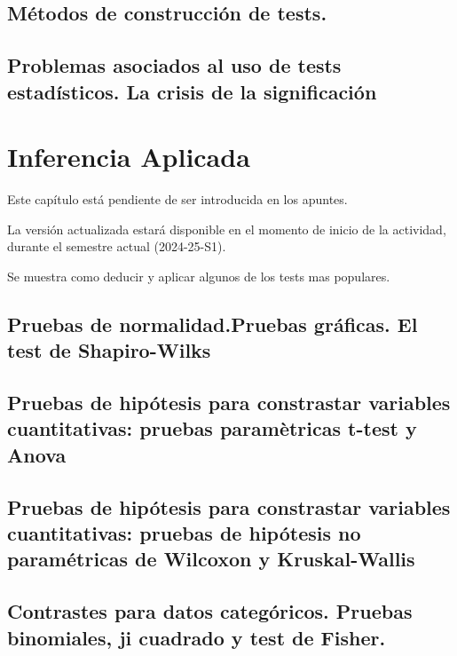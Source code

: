 \documentclass[
]{article}
\begin{document}
\subsection{Métodos de construcción de tests.}\label{muxe9todos-de-construcciuxf3n-de-tests.}

\subsection{Problemas asociados al uso de tests estadísticos. La crisis de la significación}\label{problemas-asociados-al-uso-de-tests-estaduxedsticos.-la-crisis-de-la-significaciuxf3n}

\section{Inferencia Aplicada}\label{inferencia-aplicada}

Este capítulo está pendiente de ser introducida en los apuntes.

La versión actualizada estará disponible en el momento de inicio de la actividad, durante el semestre actual (2024-25-S1).

Se muestra como deducir y aplicar algunos de los tests mas populares.

\subsection{Pruebas de normalidad.Pruebas gráficas. El test de Shapiro-Wilks}\label{pruebas-de-normalidad.pruebas-gruxe1ficas.-el-test-de-shapiro-wilks}

\subsection{Pruebas de hipótesis para constrastar variables cuantitativas: pruebas paramètricas t-test y Anova}\label{pruebas-de-hipuxf3tesis-para-constrastar-variables-cuantitativas-pruebas-paramuxe8tricas-t-test-y-anova}

\subsection{Pruebas de hipótesis para constrastar variables cuantitativas: pruebas de hipótesis no paramétricas de Wilcoxon y Kruskal-Wallis}\label{pruebas-de-hipuxf3tesis-para-constrastar-variables-cuantitativas-pruebas-de-hipuxf3tesis-no-paramuxe9tricas-de-wilcoxon-y-kruskal-wallis}

\subsection{Contrastes para datos categóricos. Pruebas binomiales, ji cuadrado y test de Fisher.}\label{contrastes-para-datos-categuxf3ricos.-pruebas-binomiales-ji-cuadrado-y-test-de-fisher.}
\end{document}
